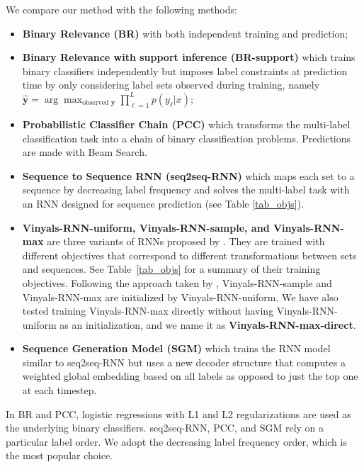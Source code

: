 We compare our method with the following methods: 
\begin{itemize}
	\item \textbf{Binary Relevance (BR)} \cite{tsoumakas2007multi} with both independent training and prediction;
	\item \textbf{Binary Relevance with support inference (BR-support)} \cite{wang2018pipeline} which trains binary classifiers independently but imposes label constraints at prediction time by only considering label sets observed during training, namely $\hat{\mathbf{y}}=\arg\max_{\text{observed~}\mathbf{y}}\prod_{\ell=1}^L p(y_{\ell}|x)$;
	\item \textbf{Probabilistic Classifier Chain (PCC)} \cite{DBLP:conf/icml/DembczynskiCH10} which transforms the multi-label classification task into a chain of binary classification problems. Predictions are made with Beam Search.
  \item \textbf{Sequence to Sequence RNN (seq2seq-RNN)} \cite{DBLP:conf/nips/NamMKF17} which maps each set to a sequence by decreasing label frequency and solves the multi-label task with an RNN designed for sequence prediction (see Table \ref{tab_objs}). 
  \item \textbf{Vinyals-RNN-uniform, Vinyals-RNN-sample, and Vinyals-RNN-max} are three variants of RNNs proposed by \cite{vinyals2015order}. They are trained with different objectives that correspond to different transformations between sets and sequences. See Table~\ref{tab_objs} for a summary of their training objectives. Following the approach taken by \cite{vinyals2015order}, Vinyals-RNN-sample and Vinyals-RNN-max are initialized by Vinyals-RNN-uniform. We have also tested training Vinyals-RNN-max directly without having Vinyals-RNN-uniform as an initialization, and we name it as \textbf{Vinyals-RNN-max-direct}.
  \item \textbf{Sequence Generation Model (SGM)} \cite{DBLP:journals/corr/abs-1806-04822} which trains the RNN model similar to seq2seq-RNN but uses a new decoder structure that computes a weighted global embedding based on all labels as opposed to just the top one at each timestep.
\end{itemize}

In BR and PCC, logistic regressions with L1 and L2 regularizations are used as the underlying binary classifiers. seq2seq-RNN, PCC, and SGM rely on a particular label order. We adopt the decreasing label frequency order, which is the most popular choice.


